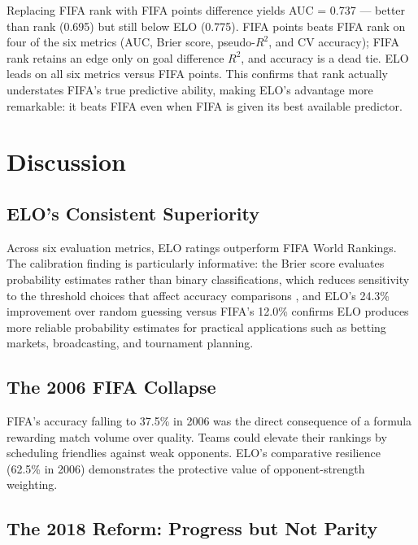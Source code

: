 \documentclass[12pt, a4paper]{article}
\begin{document}
Replacing FIFA rank with FIFA points difference yields AUC = 0.737 --- better than rank
(0.695) but still below ELO (0.775). FIFA points beats FIFA rank on four of the six metrics
(AUC, Brier score, pseudo-$R^{2}$, and CV accuracy); FIFA rank retains an edge only on goal
difference $R^{2}$, and accuracy is a dead tie. ELO leads on all six metrics versus FIFA
points. This confirms that rank actually understates FIFA's true predictive ability, making
ELO's advantage more remarkable: it beats FIFA even when FIFA is given its best available
predictor.

\section{Discussion}

\subsection{ELO's Consistent Superiority}

Across six evaluation metrics, ELO ratings outperform FIFA World Rankings. The calibration
finding is particularly informative: the Brier score evaluates probability estimates rather
than binary classifications, which reduces sensitivity to the threshold choices that affect
accuracy comparisons \cite{brier1950}, and ELO's 24.3\% improvement over random guessing versus FIFA's 12.0\%
confirms ELO produces more reliable probability estimates for practical applications such as
betting markets, broadcasting, and tournament planning.

\subsection{The 2006 FIFA Collapse}

FIFA's accuracy falling to 37.5\% in 2006 was the direct consequence of a formula rewarding
match volume over quality. Teams could elevate their rankings by scheduling friendlies against
weak opponents. ELO's comparative resilience (62.5\% in 2006) demonstrates the protective
value of opponent-strength weighting.

\subsection{The 2018 Reform: Progress but Not Parity}
\end{document}
